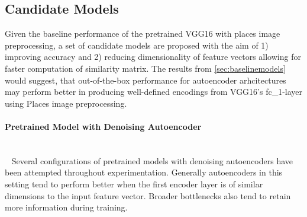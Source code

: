 \subsection{Candidate Models}
Given the baseline performance of the pretrained VGG16 with places image preprocessing, a set of candidate models are proposed with the aim of 1) improving accuracy and 2) reducing dimensionality of feature vectors allowing for faster computation of similarity matrix.
The results from \autoref{sec:baselinemodels} would suggest, that out-of-the-box performance for autoencoder arhcitectures may perform better in producing well-defined encodings from VGG16's fc\_1-layer using Places image preprocessing. 

\paragraph{Pretrained Model with Denoising Autoencoder} \\~
Several configurations of pretrained models with denoising autoencoders have been attempted throughout experimentation. 
Generally autoencoders in this setting tend to perform better when the first encoder layer is of similar dimensions to the input feature vector. 
Broader bottlenecks also tend to retain more information during training. 

\begin{table}[H]
  \centering
  \label{tab:daeresults}
\end{table}

